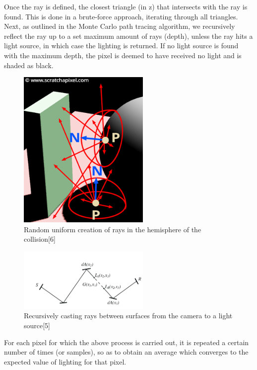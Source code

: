 \documentclass[12pt,journal]{IEEEtran}
\begin{document}
\par
Once the ray is defined, the closest triangle (in z) that intersects with the ray is found. This is done in a brute-force approach, iterating through all triangles.
Next, as outlined in the Monte Carlo path tracing algorithm, we recursively reflect the ray up to a set maximum amount of rays (depth), unless the ray hits a light source, in which case the lighting is returned. If no light source is found with the maximum depth, the pixel is deemed to have received no light and is shaded as black.

\begin{figure}[!t]

\centering
\includegraphics[width=2.5in]{shad2-indirectdiffusehemi.png}
\caption{Random uniform creation of rays in the hemisphere of the collision[6]}
\label{hemisphere rays}

\end{figure}

\begin{figure}[!t]

\centering
\includegraphics[width=2.5in]{recursive_rays}
\caption{Recursively casting rays between surfaces from the camera to a light source[5]}
\label{recursive_rays}

\end{figure}

\par
For each pixel for which the above process is carried out, it is repeated a certain number of times (or samples), so as to obtain an average which converges to the expected value of lighting for that pixel.
\end{document}
